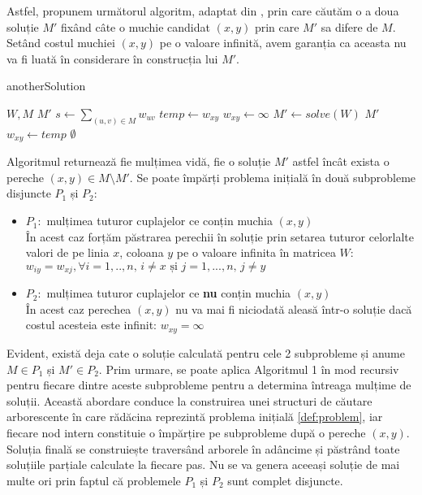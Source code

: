 Astfel, propunem următorul algoritm, adaptat din \cite{allmatchings}, prin care căutăm o a doua
soluție $M'$ fixând câte o muchie candidat $(x, y)$ prin care $M'$ sa difere de $M$. Setând costul
muchiei $(x, y)$ pe o valoare infinită, avem garanția ca aceasta nu va fi luată în considerare în 
construcția lui $M'$.
\begin{algorithm}
\label{P}
\caption{anotherSolution}
\begin{algorithmic}[1]
\REQUIRE $W, M$
\ENSURE $M'$
  \STATE $s \gets \sum_{(u, v) \in M} w_{uv}$
    \STATE $temp \gets w_{xy}$
    \STATE $w_{xy} \gets \infty$
    \STATE $M' \gets solve(W)$
    \RETURN $M'$
    \ELSE
    \STATE $w_{xy} \gets temp$
    \ENDIF
  \ENDFOR
  \RETURN $\emptyset$
\end{algorithmic}
\end{algorithm}

Algoritmul returnează fie mulțimea vidă, fie o soluție $M'$ astfel încât exista o pereche $(x, y)
\in M \setminus M'$. Se poate împărți problema inițială în două subprobleme disjuncte $P_1$ și
$P_2$:
\begin{itemize}
  \item $P_1\colon$ mulțimea tuturor cuplajelor ce conțin muchia $(x, y)$ \\
    În acest caz forțăm păstrarea perechii în soluție prin setarea tuturor celorlalte valori de pe
    linia $x$, coloana $y$ pe o valoare infinita în matricea $W$:
    $w_{iy} = w_{xj}, \forall i = 1,..,n \text{, }i \neq x  \text{ și } j = 1,...,n \text{, }j \neq y$
  \item $P_2\colon$ mulțimea tuturor cuplajelor ce \textbf{nu} conțin muchia $(x, y)$ \\
    În acest caz perechea $(x, y)$ nu va mai fi niciodată aleasă într-o soluție dacă costul acesteia
    este infinit:
    $w_{xy} = \infty$
\end{itemize}

Evident, există deja cate o soluție calculată pentru cele 2 subprobleme și anume $M \in P_1$ și 
$M' \in P_2$. Prim urmare, se poate aplica Algoritmul 1 în mod recursiv pentru fiecare dintre 
aceste subprobleme pentru a determina întreaga mulțime de soluții. Această abordare conduce la
construirea unei structuri de căutare arborescente în care rădăcina reprezintă problema inițială
\ref{def:problem}, iar fiecare nod intern constituie o împărțire pe subprobleme după o pereche 
$(x, y)$. Soluția finală se construiește traversând arborele în adâncime și păstrând toate soluțiile
parțiale calculate la fiecare pas. Nu se va genera aceeași soluție de mai multe ori prin faptul că
problemele $P_1$ și $P_2$ sunt complet disjuncte.


